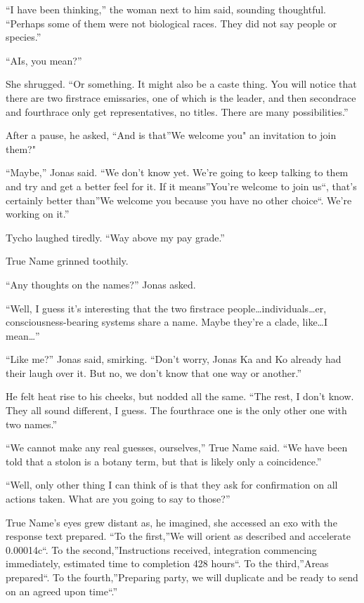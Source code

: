 ``I have been thinking,'' the woman next to him said, sounding thoughtful. ``Perhaps some of them were not biological races. They did not say people or species.''

``AIs, you mean?''

She shrugged. ``Or something. It might also be a caste thing. You will notice that there are two firstrace emissaries, one of which is the leader, and then secondrace and fourthrace only get representatives, no titles. There are many possibilities.''

After a pause, he asked, ``And is that''We welcome you" an invitation to join them?"

``Maybe,'' Jonas said. ``We don't know yet. We're going to keep talking to them and try and get a better feel for it. If it means''You're welcome to join us``, that's certainly better than''We welcome you because you have no other choice``. We're working on it.''

Tycho laughed tiredly. ``Way above my pay grade.''

True Name grinned toothily.

``Any thoughts on the names?'' Jonas asked.

``Well, I guess it's interesting that the two firstrace people\ldots individuals\ldots er, consciousness-bearing systems share a name. Maybe they're a clade, like\ldots I mean\ldots{}''

``Like me?'' Jonas said, smirking. ``Don't worry, Jonas Ka and Ko already had their laugh over it. But no, we don't know that one way or another.''

He felt heat rise to his cheeks, but nodded all the same. ``The rest, I don't know. They all sound different, I guess. The fourthrace one is the only other one with two names.''

``We cannot make any real guesses, ourselves,'' True Name said. ``We have been told that a stolon is a botany term, but that is likely only a coincidence.''

``Well, only other thing I can think of is that they ask for confirmation on all actions taken. What are you going to say to those?''

True Name's eyes grew distant as, he imagined, she accessed an exo with the response text prepared. ``To the first,''We will orient as described and accelerate 0.00014c``. To the second,''Instructions received, integration commencing immediately, estimated time to completion 428 hours``. To the third,''Areas prepared``. To the fourth,''Preparing party, we will duplicate and be ready to send on an agreed upon time``.''

